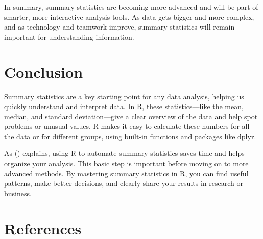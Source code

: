 \documentclass[
  man,
  floatsintext,
  longtable,
  nolmodern,
  notxfonts,
  notimes,
  colorlinks=true,linkcolor=blue,citecolor=blue,urlcolor=blue]{apa7}
\begin{document}
In summary, summary statistics are becoming more advanced and will be
part of smarter, more interactive analysis tools. As data gets bigger
and more complex, and as technology and teamwork improve, summary
statistics will remain important for understanding information.

\newpage

\section{Conclusion}\label{conclusion}

Summary statistics are a key starting point for any data analysis,
helping us quickly understand and interpret data. In R, these
statistics---like the mean, median, and standard deviation---give a
clear overview of the data and help spot problems or unusual values. R
makes it easy to calculate these numbers for all the data or for
different groups, using built-in functions and packages like dplyr.

As () explains, using R to
automate summary statistics saves time and helps organize your analysis.
This basic step is important before moving on to more advanced methods.
By mastering summary statistics in R, you can find useful patterns, make
better decisions, and clearly share your results in research or
business.

\newpage

\section{References}\label{references}
\end{document}
